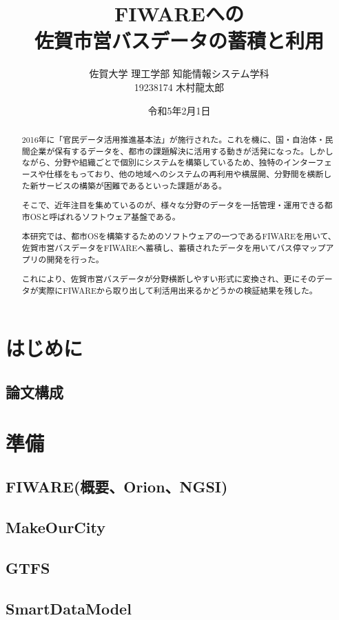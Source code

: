 \documentclass[a4paper, 12pt]{jsreport}
\title{FIWAREへの\\
佐賀市営バスデータの蓄積と利用
}
\author{佐賀大学
理工学部
知能情報システム学科\\
19238174
木村龍太郎}
\date{令和5年2月1日}
\begin{document}
  \maketitle


  \begin{abstract}
    \par 2016年に「官民データ活用推進基本法」が施行された。これを機に、国・自治体・民間企業が保有するデータを、都市の課題解決に活用する動きが活発になった。しかしながら、分野や組織ごとで個別にシステムを構築しているため、独特のインターフェースや仕様をもっており、他の地域へのシステムの再利用や横展開、分野間を横断した新サービスの構築が困難であるといった課題がある。
    \par そこで、近年注目を集めているのが、様々な分野のデータを一括管理・運用できる都市OSと呼ばれるソフトウェア基盤である。
    \par 本研究では、都市OSを構築するためのソフトウェアの一つであるFIWAREを用いて、佐賀市営バスデータをFIWAREへ蓄積し、蓄積されたデータを用いてバス停マップアプリの開発を行った。
    \par これにより、佐賀市営バスデータが分野横断しやすい形式に変換され、更にそのデータが実際にFIWAREから取り出して利活用出来るかどうかの検証結果を残した。
  \end{abstract}

  \tableofcontents

  \chapter{はじめに}
  \section{論文構成}


  \chapter{準備}


  \section{FIWARE(概要、Orion、NGSI)}
  \section{MakeOurCity}
  \section{GTFS}
  \section{SmartDataModel}
\end{document}
